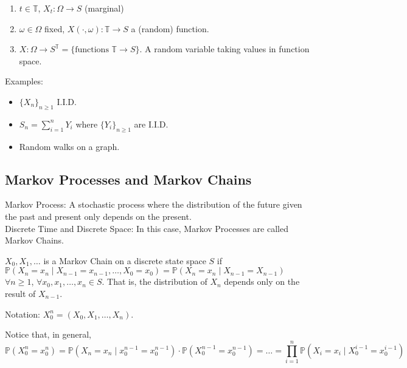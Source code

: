\documentclass[english, course]{Notes}
\begin{document}
\begin{enumerate}
	\item $t \in \mathbb{T}$, $X_t: \Omega \to S$ (marginal)
	\item $\omega \in \Omega$ fixed, $X(\cdot, \omega): \mathbb{T} \to S$ a (random) function.
	\item $X: \Omega \to S^{\mathbb{T}} = \{\text{functions } \mathbb{T} \to S\}$. A random variable taking values in function space. 
\end{enumerate}

Examples:

\begin{itemize}
	\item $\{X_n\}_{n \geq 1}$ I.I.D.
	\item $S_n = \sum_{i = 1}^n Y_i$ where $\{Y_i\}_{n \geq 1}$ are I.I.D.
	\item Random walks on a graph.
\end{itemize}

\subsection{Markov Processes and Markov Chains}

\begin{definition}
Markov Process: A stochastic process where the distribution of the future given the past and present only depends on the present.\\

Discrete Time and Discrete Space: In this case, Markov Processes are called Markov Chains.\\
\end{definition}

\begin{definition}
$X_0, X_1, \dots$ is a Markov Chain on a discrete state space $S$ if $\mathbb{P}(X_n = x_n \mid X_{n-1} = x_{n-1}, \dots, X_0 = x_0) = \mathbb{P}(X_n = x_n \mid X_{n-1} = X_{n-1})$ $\forall n \geq 1$, $\forall x_0, x_1, \dots, x_n \in S$. That is, the distribution of $X_n$ depends only on the result of $X_{n-1}$.\\
\end{definition}

\begin{remark}
Notation: $X_0^n = (X_0, X_1, \dots, X_n)$.\\
\end{remark}

Notice that, in general,
\[\mathbb{P}(X_0^n = x_0^n) = \mathbb{P}(X_n = x_n \mid x_0^{n-1} = x_0^{n-1}) \cdot \mathbb{P}(X_0^{n-1} = x_0^{n-1}) = \dots = \prod_{i=1}^{n} \mathbb{P}(X_i = x_i \mid X_0^{i-1} = x_0^{i-1})\]
\end{document}
